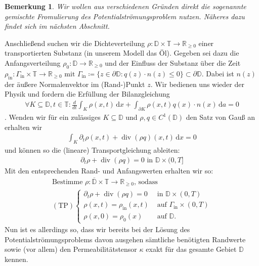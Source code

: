 \documentclass[12pt,a4paper]{scrartcl}
\numberwithin{equation}{section}
\newtheorem*{Bemerkung}{Bemerkung}
\newcommand{\R}{\mathbb{R}} %
\DeclareMathOperator{\dive}{div}
\begin{document}
\begin{Bemerkung}
	Wir wollen aus verschiedenen Gründen direkt die sogenannte gemischte Fromulierung des Potentialströmungsproblem nutzen. Näheres dazu findet sich im nächsten Abschnitt.
\end{Bemerkung}
Anschließend suchen wir die Dichteverteilung $\rho: \mathbb{D} \times \mathbb{T} \rightarrow \R_{\geq0} $ einer transportierten Substanz (in unserem Modell das Öl).  \newline
Gegeben sei dazu die Anfangsverteilung $\rho_0: \mathbb{D} \rightarrow \R_{\geq0}$ und der Einfluss der Substanz über die Zeit
$
	\rho_{\text{in}} : \Gamma_{\text{in}} \times \mathbb{T} \rightarrow \R_{\geq0} \text{ mit }  \Gamma_{\text{in}} \coloneqq  \{ z \in \partial \mathbb{D}: q(z)\cdot n(z) \leq 0 \} \subset  \partial \mathbb{D}
$.
Dabei ist $n(z)$ der äußere Normalenvektor im (Rand-)Punkt $z$.
Wir bedienen uns wieder der Physik und fordern die Erfüllung der Bilanzgleichung
\begin{align*}
	\forall K \subseteq \mathbb{D} , t\in \mathbb{T} : \frac{d}{dt} \int_K \rho(x,t) \, \mathrm{d}x + \int_{\partial K} \rho(x,t)q(x)\cdot n(x) \, \mathrm{d}a = 0
\end{align*}.
Wenden wir für ein zulässiges $K \subseteq \mathbb{D}$ und $\rho,q \in C^1(\mathbb{D})$ den Satz von Gauß an erhalten wir
\begin{align*}
	\int_K \partial_t \rho(x,t) + \dive (\rho q)(x,t) \, \mathrm{d}x = 0
\end{align*}
und können so die (lineare) Transportgleichung ableiten:
\begin{align*}
	\partial_t \rho + \dive (\rho q) = 0 \text{ in } \mathbb{D} \times (0,T]
\end{align*}
Mit den entsprechenden Rand- und Anfangswerten erhalten wir so:
\begin{gather*}
\text{Bestimme } \rho: \overline{\mathbb{D}} \times \mathbb{T} \to \R_{\geq 0} \text{, sodass}\\
(\text{TP})
\begin{cases}
\partial_t \rho + \dive(\rho q) = 0 &\text{ in } \mathbb{D} \times (0,T)\\
\rho(x,t) = \rho_{\text{in}}(x,t) &\text{ auf } \Gamma_{\text{in}} \times (0,T)\\
\rho(x,0) = \rho_0(x) &\text{ auf } \mathbb{D}.
\end{cases}
\end{gather*}
Nun ist es allerdings so, dass wir bereits bei der Lösung des Potentialströmungsproblems davon ausgehen sämtliche benötigten Randwerte sowie (vor allem) den Permeabilitätstensor $\kappa$ exakt für das gesamte Gebiet $\mathbb{D}$ kennen.
\end{document}
